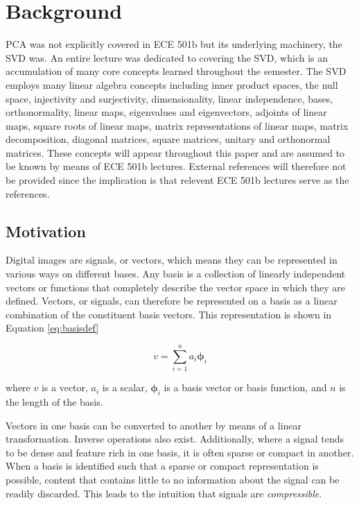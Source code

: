 \documentclass[conference]{IEEEtran}
\begin{document}
    \section{Background}
    PCA was not explicitly covered in ECE 501b but its underlying machinery, the SVD was. An entire lecture was dedicated to covering the SVD, which is an accumulation of many core concepts learned throughout the semester. The SVD employs many linear algebra concepts including inner product spaces, the null space, injectivity and surjectivity, dimensionality, linear independence, bases, orthonormality, linear maps, eigenvalues and eigenvectors, adjoints of linear maps, square roots of linear maps, matrix representations of linear maps, matrix decomposition, diagonal matrices, square matrices, unitary and orthonormal matrices. These concepts will appear throughout this paper and are assumed to be known by means of ECE 501b lectures. External references will therefore not be provided since the implication is that relevent ECE 501b lectures serve as the references.

    \subsection{Motivation}
    Digital images are signals, or vectors, which means they can be represented in various ways on different bases. Any basis is a collection of linearly independent vectors or functions that completely describe the vector space in which they are defined. Vectors, or signals, can therefore be represented on a basis as a linear combination of the constituent basis vectors. This representation is shown in Equation \ref{eq:basisdef}

    \begin{equation}
        v = \sum_{i=1}^{n} a_i \mathbf{\phi}_{i}
    \label{eq:basisdef}
    \end{equation}

    where $v$ is a vector, $a_i$ is a scalar, $\mathbf{\phi}_{i}$ is a basis vector or basis function, and $n$ is the length of the basis.

    Vectors in one basis can be converted to another by means of a linear transformation. Inverse operations also exist. Additionally, where a signal tends to be dense and feature rich in one basis, it is often sparse or compact in another. When a basis is identified such that a sparse or compact representation is possible, content that contains little to no information about the signal can be readily discarded. This leads to the intuition that signals are \textit{compressible}.
\end{document}
